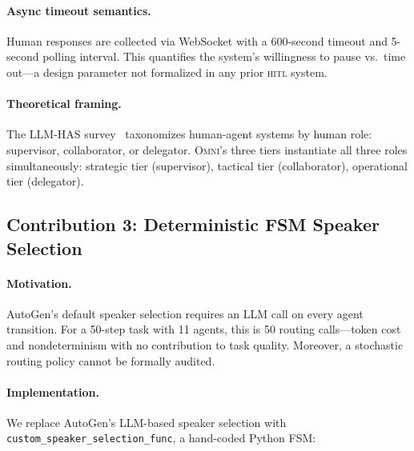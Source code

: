\documentclass[11pt,a4paper]{article}
\newcommand{\omni}{\textsc{Omni}}
\newcommand{\hitl}{\textsc{hitl}}
\begin{document}
\paragraph{Async timeout semantics.} Human responses are collected via WebSocket with a 600-second timeout and 5-second polling interval. This quantifies the system's willingness to pause vs.\ time out---a design parameter not formalized in any prior \hitl{} system.

\paragraph{Theoretical framing.} The LLM-HAS survey~\cite{llmhas2025} taxonomizes human-agent systems by human role: supervisor, collaborator, or delegator. \omni{}'s three tiers instantiate all three roles simultaneously: strategic tier (supervisor), tactical tier (collaborator), operational tier (delegator).

\subsection{Contribution 3: Deterministic FSM Speaker Selection}
\label{sec:fsm}

\paragraph{Motivation.} AutoGen's default speaker selection requires an LLM call on every agent transition. For a 50-step task with 11 agents, this is 50 routing calls---token cost and nondeterminism with no contribution to task quality. Moreover, a stochastic routing policy cannot be formally audited.

\paragraph{Implementation.} We replace AutoGen's LLM-based speaker selection with \texttt{custom\_speaker\_selection\_func}, a hand-coded Python FSM:
\end{document}
